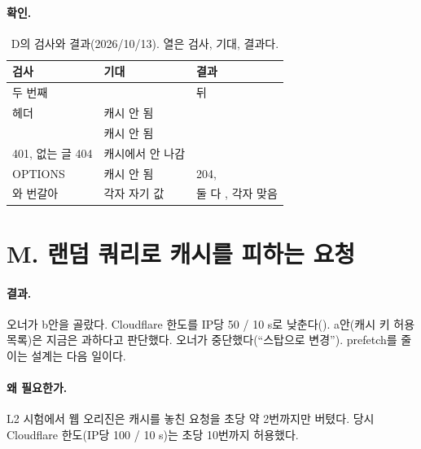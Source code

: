 \paragraph{확인.}

\begin{table}[H]
  \caption{D의 검사와 결과(2026/10/13). 열은 검사, 기대, 결과다.}
  \label{tab:rt-d-verify}
  \centering\small
  \begin{tabularx}{\linewidth}{@{}L{5.4cm}L{3.0cm}Y@{}}
    \toprule
    검사 & 기대 & 결과 \\
    \midrule
     두 번째 &  &  뒤  \\
    \midrule
     헤더 & 캐시 안 됨 &  \\
    \midrule
     & 캐시 안 됨 &  \\
    \midrule
     401, 없는 글 404 & 캐시에서 안 나감 &  \\
    \midrule
    OPTIONS & 캐시 안 됨 & 204,  \\
    \midrule
    와  번갈아 & 각자 자기 값 & 둘 다 ,  각자 맞음 \\
    \bottomrule
  \end{tabularx}
\end{table}

\section{M. 랜덤 쿼리로 캐시를 피하는 요청}\label{sec:rt-m}

\paragraph{결과.}
오너가 b안을 골랐다. Cloudflare 한도를 IP당 50 / 10 s로 낮춘다().
a안(캐시 키 허용 목록)은 지금은 과하다고 판단했다. 오너가 중단했다(``스탑으로 변경'').
prefetch를 줄이는 설계는 다음 일이다.

\paragraph{왜 필요한가.}
L2 시험에서 웹 오리진은 캐시를 놓친 요청을 초당 약 2번까지만 버텼다.
당시 Cloudflare 한도(IP당 100 / 10 s)는 초당 10번까지 허용했다.

